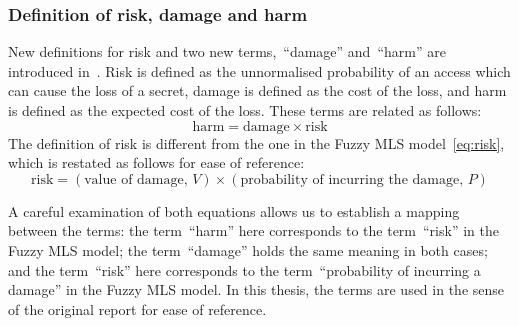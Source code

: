 
\subsubsection{Definition of risk, damage and harm}
\label{sec:ebsdefinitionofriskharmanddamage}
New definitions for risk and two new terms,~``damage'' and~``harm''
are introduced in~\cite{JPO04}. Risk is defined as the unnormalised
probability of an access which can cause the loss of a secret, damage
is defined as the cost of the loss, and harm is defined as the
expected cost of the loss. These terms are related as follows:
\begin{equation}
  \text{harm} = \text{damage} \times \text{risk} 
\label{eq:ebsharm}
\end{equation}
The definition of risk is different from the one in the Fuzzy MLS
model~\eqref{eq:risk}, which is restated as follows for ease of
reference:
\begin{equation*}
  \text{risk} = (\text{value of damage, }V) \times (\text{probability of incurring the damage, }P) 
\end{equation*}

A careful examination of both equations allows us to establish a
mapping between the terms: the term~``harm'' here corresponds to the
term~``risk'' in the Fuzzy MLS model; the term~``damage'' holds the
same meaning in both cases; and the term~``risk'' here corresponds to
the term~``probability of incurring a damage'' in the Fuzzy MLS
model. In this thesis, the terms are used in the sense of the original
report for ease of reference.

